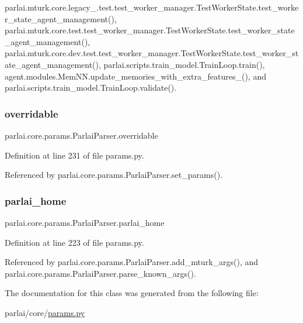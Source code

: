 parlai.\+mturk.\+core.\+legacy\+\_.\+test.\+test\+\_\+worker\+\_\+manager.\+Test\+Worker\+State.\+test\+\_\+worker\+\_\+state\+\_\+agent\+\_\+management(), parlai.\+mturk.\+core.\+test.\+test\+\_\+worker\+\_\+manager.\+Test\+Worker\+State.\+test\+\_\+worker\+\_\+state\+\_\+agent\+\_\+management(), parlai.\+mturk.\+core.\+dev.\+test.\+test\+\_\+worker\+\_\+manager.\+Test\+Worker\+State.\+test\+\_\+worker\+\_\+state\+\_\+agent\+\_\+management(), parlai.\+scripts.\+train\+\_\+model.\+Train\+Loop.\+train(), agent.\+modules.\+Mem\+N\+N.\+update\+\_\+memories\+\_\+with\+\_\+extra\+\_\+features\+\_\+(), and parlai.\+scripts.\+train\+\_\+model.\+Train\+Loop.\+validate().

\mbox{\label{classparlai_1_1core_1_1params_1_1ParlaiParser_a553d6c6c3576b217b0602befa0325e6a}} 
\subsubsection{\texorpdfstring{overridable}{overridable}}
{\footnotesize\ttfamily parlai.\+core.\+params.\+Parlai\+Parser.\+overridable}



Definition at line 231 of file params.\+py.



Referenced by parlai.\+core.\+params.\+Parlai\+Parser.\+set\+\_\+params().

\mbox{\label{classparlai_1_1core_1_1params_1_1ParlaiParser_a5ec04b6d66c84a0418930aac367bcc35}} 
\subsubsection{\texorpdfstring{parlai\+\_\+home}{parlai\_home}}
{\footnotesize\ttfamily parlai.\+core.\+params.\+Parlai\+Parser.\+parlai\+\_\+home}



Definition at line 223 of file params.\+py.



Referenced by parlai.\+core.\+params.\+Parlai\+Parser.\+add\+\_\+mturk\+\_\+args(), and parlai.\+core.\+params.\+Parlai\+Parser.\+parse\+\_\+known\+\_\+args().



The documentation for this class was generated from the following file\+:\begin{DoxyCompactItemize}
\item 
parlai/core/\hyperlink{params_8py}{params.\+py}\end{DoxyCompactItemize}
